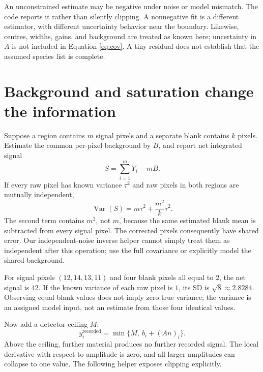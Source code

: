 An unconstrained estimate may be negative under noise or model mismatch. The code reports it rather than silently clipping. A nonnegative fit is a different estimator, with different uncertainty behavior near the boundary. Likewise, centres, widths, gains, and background are treated as known here; uncertainty in $A$ is not included in Equation \ref{eq:cov}. A tiny residual does not establish that the assumed species list is complete.

\section{Background and saturation change the information}
Suppose a region contains $m$ signal pixels and a separate blank contains $k$ pixels. Estimate the common per-pixel background by $\overline B$, and report net integrated signal
\begin{equation}
S=\sum_{i=1}^{m}Y_i-m\overline B.
\end{equation}
If every raw pixel has known variance $\tau^2$ and raw pixels in both regions are mutually independent,
\begin{equation}
\operatorname{Var}(S)=m\tau^2+\frac{m^2}{k}\tau^2. \label{eq:blank}
\end{equation}
The second term contains $m^2$, not $m$, because the same estimated blank mean is subtracted from every signal pixel. The corrected pixels consequently have shared error. Our independent-noise inverse helper cannot simply treat them as independent after this operation; use the full covariance or explicitly model the shared background.

For signal pixels $(12,14,13,11)$ and four blank pixels all equal to $2$, the net signal is $42$. If the known variance of each raw pixel is $1$, its SD is $\sqrt8\approx2.8284$. Observing equal blank values does not imply zero true variance; the variance is an assigned model input, not an estimate from those four identical values.

Now add a detector ceiling $M$:
\begin{equation}
y_i^{\mathrm{recorded}}=\min\{M,\ b_i+(An)_i\}.
\end{equation}
Above the ceiling, further material produces no further recorded signal. The local derivative with respect to amplitude is zero, and all larger amplitudes can collapse to one value. The following helper exposes clipping explicitly.


